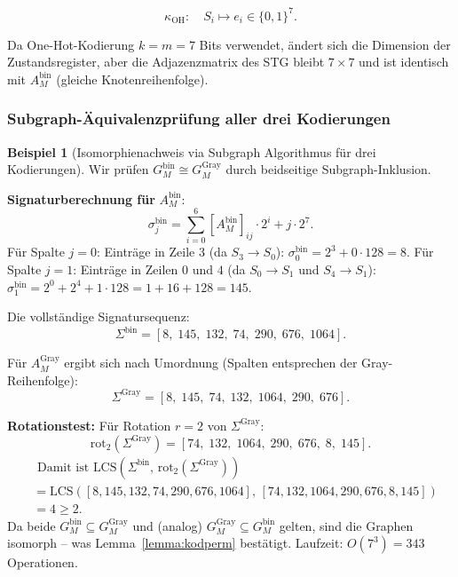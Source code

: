 ﻿\documentclass[a4paper,12pt]{article}
\theoremstyle{definition}
\newtheorem{beispiel}{Beispiel}
\begin{document}
\[
  \kappa_{\text{OH}}:
  \quad S_i \mapsto e_i \in \{0,1\}^7.
\]

Da One-Hot-Kodierung $k = m = 7$ Bits verwendet, ändert sich die Dimension der
Zustandsregister, aber die Adjazenzmatrix des STG bleibt $7 \times 7$ und ist identisch
mit $A_M^{\text{bin}}$ (gleiche Knotenreihenfolge).

\subsubsection{Subgraph-Äquivalenzprüfung aller drei Kodierungen}

\begin{beispiel}[Isomorphienachweis via Subgraph Algorithmus für drei Kodierungen]
  \label{bsp:kodzgraph}
  Wir prüfen $G_M^{\text{bin}} \cong G_M^{\text{Gray}}$ durch beidseitige
  Subgraph-Inklusion.

  \textbf{Signaturberechnung für} $A_M^{\text{bin}}$:
  \[
    \sigma_j^{\text{bin}} = \sum_{i=0}^{6} [A_M^{\text{bin}}]_{ij} \cdot 2^i + j \cdot 2^7.
  \]
  Für Spalte $j=0$: Einträge in Zeile $3$ (da $S_3 \to S_0$):
  $\sigma_0^{\text{bin}} = 2^3 + 0 \cdot 128 = 8$.
  Für Spalte $j=1$: Einträge in Zeilen $0$ und $4$ (da $S_0 \to S_1$ und $S_4 \to S_1$):
  $\sigma_1^{\text{bin}} = 2^0 + 2^4 + 1 \cdot 128 = 1 + 16 + 128 = 145$.

  Die vollständige Signatursequenz:
  \[
    \Sigma^{\text{bin}} = [8,\; 145,\; 132,\; 74,\; 290,\; 676,\; 1064].
  \]

  Für $A_M^{\text{Gray}}$ ergibt sich nach Umordnung (Spalten entsprechen der
  Gray-Reihenfolge):
  \[
    \Sigma^{\text{Gray}} = [8,\; 145,\; 74,\; 132,\; 1064,\; 290,\; 676].
  \]

  \textbf{Rotationstest:} Für Rotation $r = 2$ von $\Sigma^{\text{Gray}}$:
  \[
    \text{rot}_2(\Sigma^{\text{Gray}}) = [74,\; 132,\; 1064,\; 290,\; 676,\; 8,\; 145].
  \]
  \begin{align*}
  	& \text{ Damit ist } \text{LCS}(\Sigma^{\text{bin}},\, \text{rot}_2(\Sigma^{\text{Gray}})) \\
  	&= \text{LCS}([8,145,132,74,290,676,1064],\, [74,132,1064,290,676,8,145]) \\ 
  	&= 4 \geq 2.
  \end{align*}
  Da beide $G_M^{\text{bin}} \subseteq G_M^{\text{Gray}}$ und (analog)
  $G_M^{\text{Gray}} \subseteq G_M^{\text{bin}}$ gelten, sind die Graphen isomorph --
  was Lemma~\ref{lemma:kodperm} bestätigt. Laufzeit: $O(7^3) = 343$ Operationen.
\end{beispiel}
\end{document}
